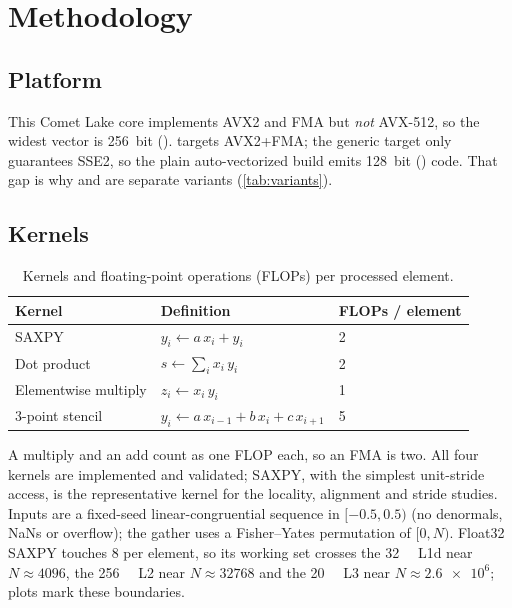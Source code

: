 \section{Methodology}\label{sec:method}

\subsection{Platform}
\newcommand{\acspinning}{Each run is pinned to one physical core
(\code{--cpu 2}, \code{sched_setaffinity}); SMT is disabled, so the core has no sibling
thread, and no other pinning/isolation is used.}


This Comet Lake core implements AVX2 and FMA but \emph{not} AVX-512, so the widest vector is
\qty{256}{bit} ().  targets AVX2+FMA; the generic 
target only guarantees SSE2, so the plain auto-vectorized build emits \qty{128}{bit} ()
code. That gap is why  and  are separate variants (\cref{tab:variants}).

\subsection{Kernels}
\begin{table}[tbp]
  \centering\small
  \caption{Kernels and floating-point operations (FLOPs) per processed element.}\label{tab:kernels}
  \begin{tabular}{@{}lll@{}}
    \toprule
    Kernel & Definition & FLOPs / element \\
    \midrule
    SAXPY               & $y_i \leftarrow a\,x_i + y_i$                         & 2 \\
    Dot product         & $s \leftarrow \sum_i x_i\, y_i$                        & 2 \\
    Elementwise multiply & $z_i \leftarrow x_i\, y_i$                            & 1 \\
    3-point stencil     & $y_i \leftarrow a\,x_{i-1} + b\,x_i + c\,x_{i+1}$      & 5 \\
    \bottomrule
  \end{tabular}
\end{table}
A multiply and an add count as one FLOP each, so an FMA is two. All four kernels are implemented
and validated; SAXPY, with the simplest unit-stride access, is the representative kernel for the
locality, alignment and stride studies. Inputs are a fixed-seed linear-congruential sequence in
$[-0.5, 0.5)$ (no denormals, NaNs or overflow); the gather uses a Fisher--Yates permutation of
$[0,N)$. Float32 SAXPY touches \qty{8}{\byte} per element, so its working set crosses the
\qty{32}{\kibi\byte} L1d near $N\approx\num{4096}$, the \qty{256}{\kibi\byte} L2 near
$N\approx\num{32768}$ and the \qty{20}{\mebi\byte} L3 near $N\approx\num{2.6e6}$; plots mark these
boundaries.

